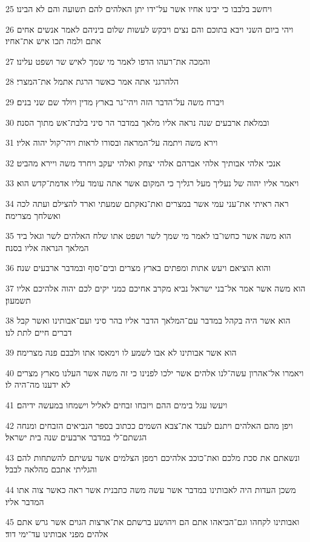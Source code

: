 \par 25 ויחשב בלבבו כי יבינו אחיו אשר על־ידו יתן האלהים להם תשועה והם לא הבינו׃
\par 26 ויהי ביום השני ויבא בתוכם והם נצים ויבקש לעשות שלום ביניהם לאמר אנשים אחים אתם ולמה תכו איש את־אחיו׃
\par 27 והמכה את־רעהו הדפו לאמר מי שמך לאיש שר ושפט עלינו׃
\par 28 הלהרגני אתה אמר כאשר הרגת אתמל את־המצרי׃
\par 29 ויברח משה על־הדבר הזה ויהי־גר בארץ מדין ויולד שם שני בנים׃
\par 30 ובמלאת ארבעים שנה נראה אליו מלאך במדבר הר סיני בלבת־אש מתוך הסנה׃
\par 31 וירא משה ויתמה על־המראה ובסורו לראות ויהי־קול יהוה אליו׃
\par 32 אנכי אלהי אבותיך אלהי אברהם אלהי יצחק ואלהי יעקב ויחרד משה ויירא מהביט׃
\par 33 ויאמר אליו יהוה של נעליך מעל רגליך כי המקום אשר אתה עומד עליו אדמת־קדש הוא׃
\par 34 ראה ראיתי את־עני עמי אשר במצרים ואת־נאקתם שמעתי וארד להצילם ועתה לכה ואשלחך מצרימה׃
\par 35 הוא משה אשר כחשו־בו לאמר מי שמך לשר ושפט אתו שלח האלהים לשר וגאל ביד המלאך הנראה אליו בסנה׃
\par 36 והוא הוציאם ויעש אתות ומפתים בארץ מצרים ובים־סוף ובמדבר ארבעים שנה׃
\par 37 הוא משה אשר אמר אל־בני ישראל נביא מקרב אחיכם כמני יקים לכם יהוה אלהיכם אליו תשמעון׃
\par 38 הוא אשר היה בקהל במדבר עם־המלאך הדבר אליו בהר סיני ועם־אבותינו ואשר קבל דברים חיים לתת לנו׃
\par 39 הוא אשר אבותינו לא אבו לשמע לו וימאסו אתו ולבבם פנה מצרימה׃
\par 40 ויאמרו אל־אהרון עשה־לנו אלהים אשר ילכו לפנינו כי זה משה אשר העלנו מארץ מצרים לא ידענו מה־היה לו׃
\par 41 ויעשו עגל בימים ההם ויזבחו זבחים לאליל וישמחו במעשה ידיהם׃
\par 42 ויפן מהם האלהים ויתנם לעבד את־צבא השמים ככתוב בספר הנביאים הזבחים ומנחה הגשתם־לי במדבר ארבעים שנה בית ישראל׃
\par 43 ונשאתם את סכת מלכם ואת־כוכב אלהיכם רמפן הצלמים אשר עשיתם להשתחות להם והגליתי אתכם מהלאה לבבל׃
\par 44 משכן העדות היה לאבותינו במדבר אשר עשה משה כתבנית אשר ראה כאשר צוה אתו המדבר אליו׃
\par 45 ואבותינו לקחהו וגם־הביאהו אתם הם ויהושע ברשתם את־ארצות הגוים אשר גרש אתם אלהים מפני אבותינו עד־ימי דוד׃
